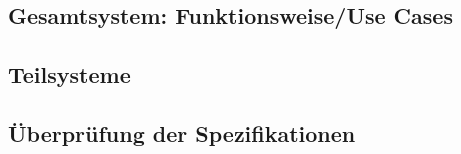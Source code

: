 \subsection{Gesamtsystem: Funktionsweise/Use Cases}

\subsection{Teilsysteme}

\subsection{\"Uberpr\"ufung der Spezifikationen}
